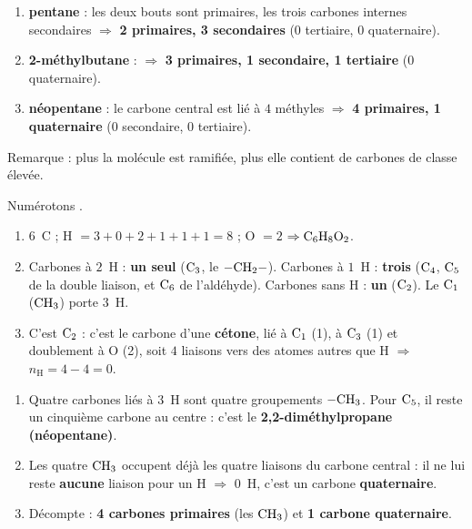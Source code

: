 \documentclass[11pt,a4paper]{article}
\begin{document}
\begin{corrige}
\begin{enumerate}[label=\alph*)]
  \item \textbf{pentane}  : les deux bouts sont primaires, les trois carbones internes secondaires $\Rightarrow$ \textbf{2 primaires, 3 secondaires} (0 tertiaire, 0 quaternaire).
  \item \textbf{2-méthylbutane} : $\Rightarrow$ \textbf{3 primaires, 1 secondaire, 1 tertiaire} (0 quaternaire).
  \item \textbf{néopentane} : le carbone central est lié à $4$ méthyles $\Rightarrow$ \textbf{4 primaires, 1 quaternaire} (0 secondaire, 0 tertiaire).
\end{enumerate}
Remarque : plus la molécule est ramifiée, plus elle contient de carbones de classe élevée.
\end{corrige}

\begin{corrige}
Numérotons .
\begin{enumerate}[label=\alph*)]
  \item $6$~C ; H $=3+0+2+1+1+1=8$ ; O $=2$ $\Rightarrow \ce{C6H8O2}$.
  \item Carbones à $2$~H : \textbf{un seul} ($\ce{C3}$, le $\ce{-CH2-}$). Carbones à $1$~H : \textbf{trois} ($\ce{C4}$, $\ce{C5}$ de la double liaison, et $\ce{C6}$ de l'aldéhyde). Carbones sans H : \textbf{un} ($\ce{C2}$). Le $\ce{C1}$ ($\ce{CH3}$) porte $3$~H.
  \item C'est $\ce{C2}$ : c'est le carbone d'une \textbf{cétone}, lié à $\ce{C1}$ (1), à $\ce{C3}$ (1) et doublement à O (2), soit $4$ liaisons vers des atomes autres que H $\Rightarrow$ $n_{\text{H}}=4-4=0$.
\end{enumerate}
\end{corrige}

\begin{corrige}
\begin{enumerate}[label=\alph*)]
  \item Quatre carbones liés à $3$~H sont quatre groupements $\ce{-CH3}$. Pour $\ce{C5}$, il reste un cinquième carbone au centre : c'est le \textbf{2,2-diméthylpropane (néopentane)}.
  \item Les quatre $\ce{CH3}$ occupent déjà les quatre liaisons du carbone central : il ne lui reste \textbf{aucune} liaison pour un H $\Rightarrow$ $0$~H, c'est un carbone \textbf{quaternaire}.
  \item Décompte : \textbf{4 carbones primaires} (les $\ce{CH3}$) et \textbf{1 carbone quaternaire}.
\end{enumerate}
\end{corrige}
\end{document}
